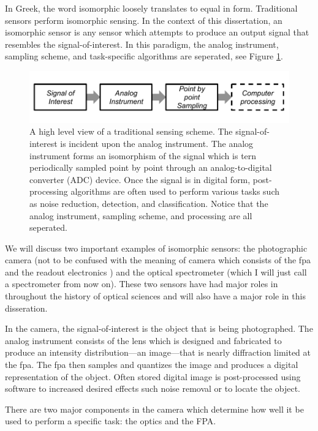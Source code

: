 In Greek, the word isomorphic loosely translates to equal in form. Traditional sensors perform isomorphic sensing. In the context of this dissertation, an isomorphic sensor is any sensor which attempts to produce an output signal that resembles the signal-of-interest. In this paradigm, the analog instrument, sampling scheme, and task-specific algorithms are seperated, see Figure \ref{fig:isomorphicsesingflowchart}.


\begin{figure}
    \centering
    \includegraphics[scale=1]{isomorphicsensorflowchart}
    \caption{A high level view of a traditional sensing scheme. The signal-of-interest is incident upon the analog instrument. The analog instrument forms an isomorphism of the signal which is tern periodically sampled point by point through an analog-to-digital converter (ADC) device. Once the signal is in digital form, post-processing algorithms are often used to perform various tasks such as noise reduction, detection, and classification. Notice that the analog instrument, sampling scheme, and processing are all seperated. }
    \label{fig:isomorphicsesingflowchart}
\end{figure}

We will discuss two important examples of isomorphic sensors: the photographic camera (not to be confused with the meaning of camera which consists of the \gls{fpa} and the readout electronics ) and the optical spectrometer (which I will just call a spectrometer from now on). These two sensors have had major roles in throughout the history of optical sciences and will also have a major role in this disseration. 

In the camera, the signal-of-interest is the object that is being photographed. The analog instrument consists of the lens which is designed and fabricated to produce an intensity distribution---an image---that is nearly diffraction limited at the \gls{fpa}. The \gls{fpa} then samples and quantizes the image and produces a digital representation of the object. Often stored digital image is post-processed using software to increased desired effects such noise removal or to locate the object. 

There are two major components in the camera which determine how well it be used to perform a specific task: the optics and the FPA. 

